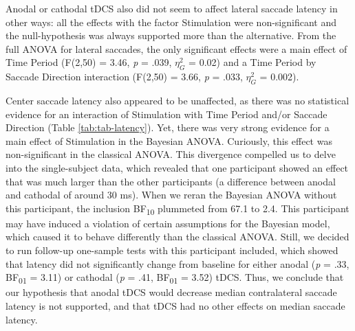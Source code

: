 \documentclass[11pt,]{memoir}
\begin{document}
Anodal or cathodal tDCS also did not seem to affect lateral saccade latency in other ways: all the effects with the factor Stimulation were non-significant and the null-hypothesis was always supported more than the alternative. From the full ANOVA for lateral saccades, the only significant effects were a main effect of Time Period (F(2,50) = 3.46, \emph{p} = .039, \(\eta_{G}^{2}\) = 0.02) and a Time Period by Saccade Direction interaction (F(2,50) = 3.66, \emph{p} = .033, \(\eta_{G}^{2}\) = 0.002).

Center saccade latency also appeared to be unaffected, as there was no statistical evidence for an interaction of Stimulation with Time Period and/or Saccade Direction (Table \ref{tab:tab-latency}). Yet, there was very strong evidence for a main effect of Stimulation in the Bayesian ANOVA. Curiously, this effect was non-significant in the classical ANOVA. This divergence compelled us to delve into the single-subject data, which revealed that one participant showed an effect that was much larger than the other participants (a difference between anodal and cathodal of around 30 ms). When we reran the Bayesian ANOVA without this participant, the inclusion BF\textsubscript{10} plummeted from 67.1 to 2.4. This participant may have induced a violation of certain assumptions for the Bayesian model, which caused it to behave differently than the classical ANOVA. Still, we decided to run follow-up one-sample tests with this participant included, which showed that latency did not significantly change from baseline for either anodal (\emph{p} = .33, BF\textsubscript{01} = 3.11) or cathodal (\emph{p} = .41, BF\textsubscript{01} = 3.52) tDCS. Thus, we conclude that our hypothesis that anodal tDCS would decrease median contralateral saccade latency is not supported, and that tDCS had no other effects on median saccade latency.
\end{document}
